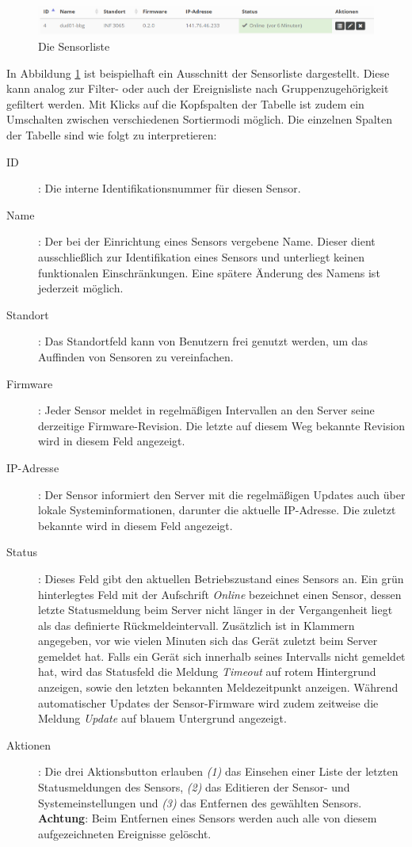 \documentclass[12pt]{article}
\begin{document}
\begin{figure}[h]
				\centering
				\includegraphics[width=\textwidth]{./graphics/sensors-list.png}
				\caption{Die Sensorliste}
				\label{fig:sensors-list}
\end{figure}

In Abbildung \ref{fig:sensors-list} ist beispielhaft ein Ausschnitt der Sensorliste dargestellt. Diese kann analog zur Filter- oder auch der Ereignisliste nach Gruppenzugehörigkeit gefiltert werden. Mit Klicks auf die Kopfspalten der Tabelle ist zudem ein Umschalten zwischen verschiedenen Sortiermodi möglich. Die einzelnen Spalten der Tabelle sind wie folgt zu interpretieren:
\begin{description}
				\item[ID]: Die interne Identifikationsnummer für diesen Sensor.
				\item[Name]: Der bei der Einrichtung eines Sensors vergebene Name. Dieser dient ausschließlich zur Identifikation eines Sensors und unterliegt keinen funktionalen Einschränkungen. Eine spätere Änderung des Namens ist jederzeit möglich.
				\item[Standort]: Das Standortfeld kann von Benutzern frei genutzt werden, um das Auffinden von Sensoren zu vereinfachen.
				\item[Firmware]: Jeder Sensor meldet in regelmäßigen Intervallen an den Server seine derzeitige Firmware-Revision. Die letzte auf diesem Weg bekannte Revision wird in diesem Feld angezeigt.
				\item[IP-Adresse]: Der Sensor informiert den Server mit die regelmäßigen Updates auch über lokale Systeminformationen, darunter die aktuelle IP-Adresse. Die zuletzt bekannte wird in diesem Feld angezeigt.
				\item[Status]: Dieses Feld gibt den aktuellen Betriebszustand eines Sensors an. Ein grün hinterlegtes Feld mit der Aufschrift \textit{Online} bezeichnet einen Sensor, dessen letzte Statusmeldung beim Server nicht länger in der Vergangenheit liegt als das definierte Rückmeldeintervall. Zusätzlich ist in Klammern angegeben, vor wie vielen Minuten sich das Gerät zuletzt beim Server gemeldet hat. Falls ein Gerät sich innerhalb seines Intervalls nicht gemeldet hat, wird das Statusfeld die Meldung \textit{Timeout} auf rotem Hintergrund anzeigen, sowie den letzten bekannten Meldezeitpunkt anzeigen. Während automatischer Updates der Sensor-Firmware wird zudem zeitweise die Meldung \textit{Update} auf blauem Untergrund angezeigt.
				\item[Aktionen]: Die drei Aktionsbutton erlauben \textit{(1)} das Einsehen einer Liste der letzten Statusmeldungen des Sensors, \textit{(2)} das Editieren der Sensor- und Systemeinstellungen und \textit{(3)} das Entfernen des gewählten Sensors. \textbf{Achtung}: Beim Entfernen eines Sensors werden auch alle von diesem aufgezeichneten Ereignisse gelöscht.
\end{description}
\end{document}
